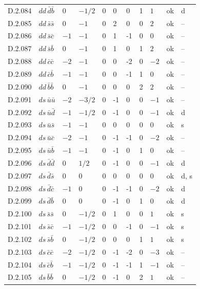 {\begin{longtable}{@{}llllllllll>{\raggedright\arraybackslash}p{2.0cm}@{}}
D.2.084 & $dd\,\bar{d}\bar{b}$ & $0$ & $-1/2$ & $0$ & 0 & 0 & 1 & $1$ & ok & d \\
D.2.085 & $dd\,\bar{s}\bar{s}$ & $0$ & $-1$ & $0$ & 2 & 0 & 0 & $2$ & ok & -- \\
D.2.086 & $dd\,\bar{s}\bar{c}$ & $-1$ & $-1$ & $0$ & 1 & -1 & 0 & $0$ & ok & -- \\
D.2.087 & $dd\,\bar{s}\bar{b}$ & $0$ & $-1$ & $0$ & 1 & 0 & 1 & $2$ & ok & -- \\
D.2.088 & $dd\,\bar{c}\bar{c}$ & $-2$ & $-1$ & $0$ & 0 & -2 & 0 & $-2$ & ok & -- \\
D.2.089 & $dd\,\bar{c}\bar{b}$ & $-1$ & $-1$ & $0$ & 0 & -1 & 1 & $0$ & ok & -- \\
D.2.090 & $dd\,\bar{b}\bar{b}$ & $0$ & $-1$ & $0$ & 0 & 0 & 2 & $2$ & ok & -- \\
D.2.091 & $ds\,\bar{u}\bar{u}$ & $-2$ & $-3/2$ & $0$ & -1 & 0 & 0 & $-1$ & ok & -- \\
D.2.092 & $ds\,\bar{u}\bar{d}$ & $-1$ & $-1/2$ & $0$ & -1 & 0 & 0 & $-1$ & ok & d \\
D.2.093 & $ds\,\bar{u}\bar{s}$ & $-1$ & $-1$ & $0$ & 0 & 0 & 0 & $0$ & ok & s \\
D.2.094 & $ds\,\bar{u}\bar{c}$ & $-2$ & $-1$ & $0$ & -1 & -1 & 0 & $-2$ & ok & -- \\
D.2.095 & $ds\,\bar{u}\bar{b}$ & $-1$ & $-1$ & $0$ & -1 & 0 & 1 & $0$ & ok & -- \\
D.2.096 & $ds\,\bar{d}\bar{d}$ & $0$ & $1/2$ & $0$ & -1 & 0 & 0 & $-1$ & ok & d \\
D.2.097 & $ds\,\bar{d}\bar{s}$ & $0$ & $0$ & $0$ & 0 & 0 & 0 & $0$ & ok & d, s \\
D.2.098 & $ds\,\bar{d}\bar{c}$ & $-1$ & $0$ & $0$ & -1 & -1 & 0 & $-2$ & ok & d \\
D.2.099 & $ds\,\bar{d}\bar{b}$ & $0$ & $0$ & $0$ & -1 & 0 & 1 & $0$ & ok & d \\
D.2.100 & $ds\,\bar{s}\bar{s}$ & $0$ & $-1/2$ & $0$ & 1 & 0 & 0 & $1$ & ok & s \\
D.2.101 & $ds\,\bar{s}\bar{c}$ & $-1$ & $-1/2$ & $0$ & 0 & -1 & 0 & $-1$ & ok & s \\
D.2.102 & $ds\,\bar{s}\bar{b}$ & $0$ & $-1/2$ & $0$ & 0 & 0 & 1 & $1$ & ok & s \\
D.2.103 & $ds\,\bar{c}\bar{c}$ & $-2$ & $-1/2$ & $0$ & -1 & -2 & 0 & $-3$ & ok & -- \\
D.2.104 & $ds\,\bar{c}\bar{b}$ & $-1$ & $-1/2$ & $0$ & -1 & -1 & 1 & $-1$ & ok & -- \\
D.2.105 & $ds\,\bar{b}\bar{b}$ & $0$ & $-1/2$ & $0$ & -1 & 0 & 2 & $1$ & ok & -- \\

\end{longtable}}
